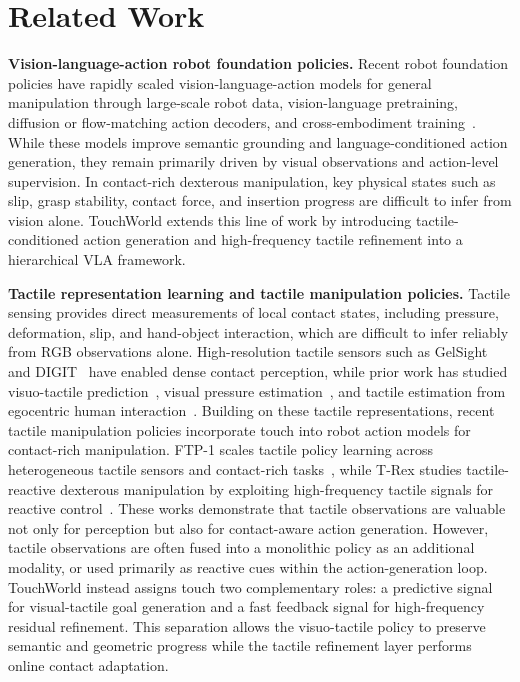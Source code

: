 \section{Related Work}
\noindent\textbf{Vision-language-action robot foundation policies.}
Recent robot foundation policies have rapidly scaled vision-language-action models for general manipulation through large-scale robot data, vision-language pretraining, diffusion or flow-matching action decoders, and cross-embodiment training~\cite{intelligence2025pi05visionlanguageactionmodelopenworld,nvidia2025gr00tn1openfoundation,liu2025rdt1bdiffusionfoundationmodel,wang2026qwenvlaunifyingvisionlanguageactionmodeling}.
While these models improve semantic grounding and language-conditioned action generation, they remain primarily driven by visual observations and action-level supervision.
In contact-rich dexterous manipulation, key physical states such as slip, grasp stability, contact force, and insertion progress are difficult to infer from vision alone.
TouchWorld extends this line of work by introducing tactile-conditioned action generation and high-frequency tactile refinement into a hierarchical VLA framework.

\noindent\textbf{Tactile representation learning and tactile manipulation policies.}
Tactile sensing provides direct measurements of local contact states, including pressure, deformation, slip, and hand-object interaction, which are difficult to infer reliably from RGB observations alone.
High-resolution tactile sensors such as GelSight~\cite{yuan2017gelsight} and DIGIT~\cite{lambeta2020digit} have enabled dense contact perception, while prior work has studied visuo-tactile prediction~\cite{li2019visgel}, visual pressure estimation~\cite{yang2022pressurevision,grady2024pressurevision++}, and tactile estimation from egocentric human interaction~\cite{zhou2026touchanythingdatasetframeworkbimanual}.
Building on these tactile representations, recent tactile manipulation policies incorporate touch into robot action models for contact-rich manipulation.
FTP-1 scales tactile policy learning across heterogeneous tactile sensors and contact-rich tasks~\cite{yuan2026ftp1generalistfoundationtactile}, while T-Rex studies tactile-reactive dexterous manipulation by exploiting high-frequency tactile signals for reactive control~\cite{niu2026trextactilereactivedexterousmanipulation}.
These works demonstrate that tactile observations are valuable not only for perception but also for contact-aware action generation.
However, tactile observations are often fused into a monolithic policy as an additional modality, or used primarily as reactive cues within the action-generation loop.
TouchWorld instead assigns touch two complementary roles: a predictive signal for visual-tactile goal generation and a fast feedback signal for high-frequency residual refinement.
This separation allows the visuo-tactile policy to preserve semantic and geometric progress while the tactile refinement layer performs online contact adaptation.

